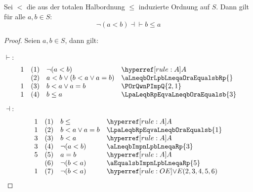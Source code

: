 \documentclass[main.tex]{subfiles}
\begin{document}
\label{nLpaLneqbRpEqvbLeqa}
\begin{theorem}
    Sei \(<\) die aus der totalen Halbordnung \(\leq\) induzierte Ordnung auf \(S\). Dann gilt für alle \(a,b\in S\):
    \[
    \neg(a<b)\dashv\vdash b\leq a
    \]
\end{theorem}
\begin{proof}
        Seien \(a,b\in S\), dann gilt:
        
\(\vdash\):
	\[
        \begin{array}{llll}
          1     &   (1)     &   \neg(a<b)                   & \rA                               \\
                &   (2)     &   a<b\lor (b<a\lor a=b)       & \aLneqbOrLpbLneqaOraEqualsbRp{}   \\
          1     &   (3)     &   b<a\lor a=b                 & \POrQwnPImpQ{2,1}                 \\
          1     &   (4)     &   b\leq a                     & \LpaLeqbRpEqvaLneqbOraEqualsb{3}  \\
        \end{array}
	\]
\(\dashv\):
 	\[
        \begin{array}{llll}
            1   &   (1) &   b\leq               &   \rA                                \\
            1   &   (2) &   b<a\lor a=b         &   \LpaLeqbRpEqvaLneqbOraEqualsb{1}   \\
            3   &   (3) &   b<a                 &   \rA                                \\
            3   &   (4) &   \neg(a<b)           &   \aLneqbImpnLpbLneqaRp{3}           \\
            5   &   (5) &   a=b                 &   \rA                                \\
                &   (6) &   \neg(b<a)           &   \aEqualsbImpnLpbLneqaRp{5}         \\
            1   &   (7) &   \neg(b<a)           & \rOE{2,3,4,5,6}                      \\
        \end{array}
	\]
\end{proof}
\end{document}

